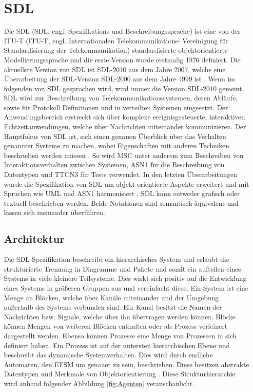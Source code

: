 \section{\acf{SDL}}
\label{sc:SDL}
Die \acs{SDL} (\ac{SDL}, engl. Spezifikations und Beschreibungssprache) ist eine von der \ac{ITU-T} (\ac{ITU-T}, engl. Internationalen 
Telekommunikations- Vereinigung für Standardisierung der Telekommunikation) standardisierte objektorientierte Modellierungssprache und die erste Version wurde erstmalig 
1976 definiert. Die aktuellste Version von \ac{SDL} ist \ac{SDL}-2010 aus dem Jahre 2007, welche eine Überarbeitung der \ac{SDL}-Version \ac{SDL}-2000 aus dem Jahre 
1999 ist \cite[vii,51]{ITUT100_2016}. Wenn im folgenden von \ac{SDL} gesprochen wird, wird immer die Version \acs{SDL}-2010 gemeint. 
\ac{SDL} wird zur Beschreibung von Telekommunikationssystemen, deren Abläufe, sowie für Protokoll Definitionen und in verteilten Systemen eingesetzt.
Der Anwendungsbereich erstreckt sich über komplexe ereignisgesteuerte, interaktiven Echtzeitanwendungen, welche über Nachrichten miteinander kommunizieren. 
Der Hauptfokus von \ac{SDL} ist, sich einen genauen Überblick über das Verhalten genannter Systeme zu machen, wobei Eigenschaften mit anderen Techniken beschrieben werden müssen \cite[1\psq]{ITUT100_2016}. 
So wird \ac{MSC} unter anderem zum Beschreiben von Interaktionsverhalten zwischen Systemen, \ac{ASN1} für die Beschreibung von Datentypen und \ac{TTCN3} für Tests verwendet. In den letzten Überarbeitungen wurde die Spezifikation von \ac{SDL} um objekt-orientierte Aspekte erweitert und mit Sprachen wie \ac{UML} und \ac{ASN1} harmonisiert \cite[vii\psqq]{ITUT100_2016}. \ac{SDL} kann entweder grafisch oder textuell beschrieben werden. Beide Notationen sind semantisch äquivalent und lassen sich ineinander überführen.

\subsection{Architektur}
\label{ssc:Architektur}
Die \ac{SDL}-Spezifikation beschreibt ein hierarchisches System und erlaubt die strukturierte Trennung in Diagramme und Pakete und somit ein aufteilen eines Systems in viele kleinere Teilsysteme. Dies wirkt sich positiv auf die Entwicklung eines Systems in größeren Gruppen aus und vereinfacht diese. Ein System ist eine Menge an Blöcken, welche über Kanäle miteinander und der Umgebung außerhalb des Systems verbunden sind. Ein Kanal besitzt die Namen der Nachrichten bzw. Signale, welche über ihn übertragen werden können. Blöcke können Mengen von weiteren Blöcken enthalten oder als Prozess verfeinert dargestellt werden. Ebenso können Prozesse eine Menge von Prozessen in sich definiert haben.
Ein Prozess ist auf der untersten hierarchischen Ebene und beschreibt das dynamische Systemverhalten. Dies wird durch endliche Automaten, den \ac{EFSM} um genauer zu sein, beschrieben. Diese besitzen abstrakte Datentypen und Merkmale von Objektorientierung \cite[3\psq]{ITUT100_2016}. Diese Strukturhierarchie wird anhand folgender Abbildung \ref{fig:Agenten} veranschaulicht.
 
